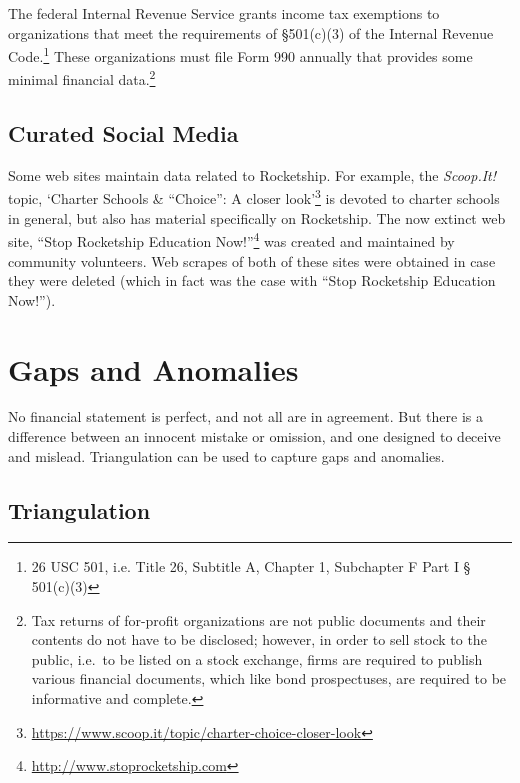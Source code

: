 The federal Internal Revenue Service grants income tax exemptions to organizations that meet the requirements of §501(c)(3) of the  Internal Revenue Code.\footnote{26 USC 501, i.e. Title 26, Subtitle A, Chapter 1, Subchapter F Part I § 501(c)(3)} These organizations must file Form 990 annually that provides some minimal financial data.\footnote{Tax returns of for-profit organizations are not public documents and their contents do not have to be disclosed; however, in order to sell stock to the public, i.e.~to be listed on a stock exchange, firms are required to publish various financial documents, which like bond prospectuses, are required to be informative and complete.} %

\subsection{Curated Social Media}\label{sec:curated-social-media}\indent%

Some web sites maintain data related to Rocketship. For example, the \textit{Scoop.It!} topic, `Charter Schools \& ``Choice'': A closer look'\footnote{\url{https://www.scoop.it/topic/charter-choice-closer-look}} is devoted to charter schools in general, but also has material specifically on Rocketship. The now extinct web site, ``Stop Rocketship Education Now!''\footnote{\url{http://www.stoprocketship.com}} was created and maintained by community volunteers. Web scrapes of both of these sites were obtained in case they were deleted (which in fact was the case with ``Stop Rocketship Education Now!'').

\section{Gaps and Anomalies}\label{sec:gaps-anomalies}\indent%

No financial statement is perfect, and not all are in agreement. But there is a difference between an innocent mistake or omission, and one designed to deceive and mislead. Triangulation can be used to capture gaps and anomalies.

\subsection{Triangulation}\label{sec:triangulation}\indent%

